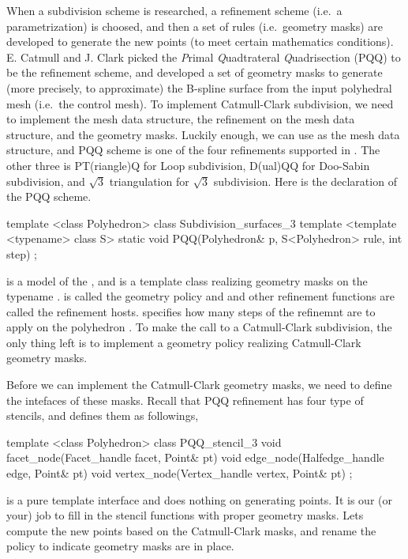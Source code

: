 When a subdivision scheme is researched, a refinement scheme (i.e.~a 
parametrization) is choosed, and then a set of rules (i.e.~geometry 
masks) are developed to generate the new points (to meet certain 
mathematics conditions). E. Catmull and J. Clark picked the \emph{P}rimal 
\emph{Q}uadtrateral \emph{Q}uadrisection (PQQ) to be the refinement scheme,
and developed a set of geometry masks to generate (more precisely, to 
approximate) the B-spline surface from the input polyhedral mesh (i.e.~the 
control mesh). To implement Catmull-Clark subdivision, we need to 
implement the mesh data structure, the refinement on the mesh data 
structure, and the geometry masks. Luckily enough, we can use 
 as the mesh data structure, and PQQ scheme 
is one of the four refinements supported in . 
The other three is PT(riangle)Q for Loop subdivision, D(ual)QQ for 
Doo-Sabin subdivision, and $\sqrt{3}$ triangulation for $\sqrt{3}$ 
subdivision. Here is the declaration of the PQQ scheme.

\begin{ccExampleCode}
template <class Polyhedron>
class Subdivision_surfaces_3 {
  template <template <typename> class S>
  static void PQQ(Polyhedron& p, S<Polyhedron> rule, int step)
};
\end{ccExampleCode}

 is a model of the , and
 is a template class realizing geometry masks on the typename 
.  is called the
geometry policy and  and other refinement functions are 
called the refinement hosts.  specifies how many steps of the 
refinemnt are to apply on the polyhedron . To make the call to
 a Catmull-Clark subdivision, the only thing left is to
implement a geometry policy realizing Catmull-Clark geometry masks.

Before we can implement the Catmull-Clark geometry masks, we need to 
define the intefaces of these masks. Recall that PQQ refinement has four
type of stencils, and  defines them as followings,
\begin{ccExampleCode}
template <class Polyhedron>
class PQQ_stencil_3 {
  void facet_node(Facet_handle facet, Point& pt) {}
  void edge_node(Halfedge_handle edge, Point& pt) {}
  void vertex_node(Vertex_handle vertex, Point& pt) {}
};
\end{ccExampleCode}

 is a pure template interface and does nothing on generating 
points. It is our (or your) job to fill in the stencil functions with
proper geometry masks. Lets compute the new points based on the Catmull-Clark
masks, and rename the policy to indicate geometry masks are in place.

